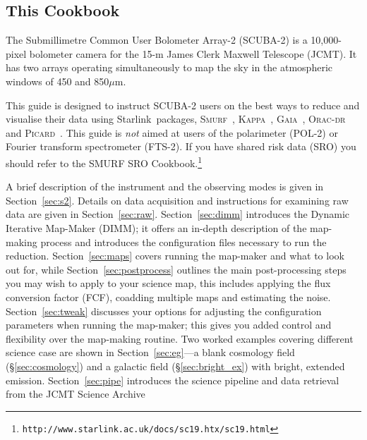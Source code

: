 \documentclass[twoside,11pt]{article}
\newcommand{\htmladdnormallink}[2]{#1}
\newcommand{\htmlref}[2]{#1}
\newenvironment{latexonly}{}{}
\newcommand{\latex}[1]{#1}
\newcommand{\latexhtml}[2]{#1}
\newcommand{\xref}[3]{#1}
\newcommand{\xlabel}[1]{}
\renewcommand{\_}{\texttt{\symbol{95}}}
\newcommand{\starlink}{\htmladdnormallink{Starlink}{http://starlink.jach.hawaii.edu}}
\newcommand{\gaia}{\xref{\textsc{Gaia}}{sun214}{}}
\newcommand{\Kappa}{\xref{\textsc{Kappa}}{sun95}{}}
\newcommand{\oracdr}{\htmladdnormallink{\textsc{Orac-dr}}{http://www.oracdr.org/oracdr}}
\newcommand{\picard}{\xref{\textsc{Picard}}{sun265}{}}
\newcommand{\smurf}{\xref{\textsc{Smurf}}{sun258}{}}
\newcommand{\cref}[3]{\latexhtml{#1~\ref{#2}}{\htmlref{#3}{#2}}}
\begin{document}
\subsection{\xlabel{using_guide}This Cookbook}

The Submillimetre Common User Bolometer Array-2 (SCUBA-2) is a
10,000-pixel bolometer camera for the 15-m James Clerk Maxwell
Telescope (JCMT). It has two arrays operating simultaneously to map
the sky in the atmospheric windows of 450 and 850$\mu$m.

This guide is designed to instruct SCUBA-2 users on the best ways to
reduce and visualise their data using \starlink\ packages,
\smurf\ \cite{smurf}, \Kappa\ \cite{kappa}, \gaia\ \cite{gaia}, \oracdr\ \cite{oracdr} and \picard\
\cite{picard}. This guide is {\em not} aimed at users of the
polarimeter (POL-2) or Fourier transform spectrometer (FTS-2). If you
have shared risk data (SRO) you should refer to the
\xref{SMURF SRO
Cookbook.}{sc19}{}\latex{\footnote{\texttt{http://www.starlink.ac.uk/docs/sc19.htx/sc19.html}}}

A brief description of the instrument and the observing modes is given
in \cref{Section}{sec:s2}{an Overview}. Details on data acquisition and
instructions for examining raw data are given in
\cref{Section}{sec:raw}{Raw SCUBA-2 data}.
\cref{Section}{sec:dimm}{This page} introduces the Dynamic Iterative Map-Maker
(DIMM); it offers an in-depth description of the map-making
process and introduces the configuration files necessary to run the
reduction. \cref{Section}{sec:maps}{Reducing your Data} covers running
the map-maker and what to look out for, while
\cref{Section}{sec:postprocess}{Post-processing Reduction Steps}
outlines the main post-processing steps you may wish to apply to your
science map, this includes applying the flux conversion
factor (FCF), coadding multiple maps and estimating the noise.
\cref{Section}{sec:tweak}{Tweaking the configuration file}
discusses your options for adjusting the configuration
parameters when running the map-maker; this gives you added control
and flexibility over the map-making routine. Two worked examples
covering different science case are shown in
\cref{Section}{sec:eg}{Examples}---a
\htmlref{blank cosmology field}{sec:cosmology}
\begin{latexonly}
(\S\ref{sec:cosmology})
\end{latexonly}
and a \htmlref{galactic field}{sec:bright_ex}
\begin{latexonly}
(\S\ref{sec:bright_ex})
\end{latexonly}
with bright, extended emission.
\cref{Section}{sec:pipe}{SCUBA-2 Pipeline} introduces the science
pipeline and data retrieval from the
\htmladdnormallink{JCMT Science Archive}{http://www3.cadc-ccda.hia-iha.nrc-cnrc.gc.ca/jcmt/}
\end{document}
